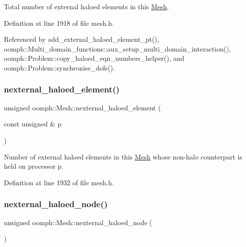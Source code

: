 Total number of external haloed elements in this \hyperlink{classoomph_1_1Mesh}{Mesh}. 



Definition at line 1918 of file mesh.\+h.



Referenced by add\+\_\+external\+\_\+haloed\+\_\+element\+\_\+pt(), oomph\+::\+Multi\+\_\+domain\+\_\+functions\+::aux\+\_\+setup\+\_\+multi\+\_\+domain\+\_\+interaction(), oomph\+::\+Problem\+::copy\+\_\+haloed\+\_\+eqn\+\_\+numbers\+\_\+helper(), and oomph\+::\+Problem\+::synchronise\+\_\+dofs().

\mbox{\label{classoomph_1_1Mesh_a32846269a1902f442314d6a711c64464}} 
\subsubsection{\texorpdfstring{nexternal\+\_\+haloed\+\_\+element()}{nexternal\_haloed\_element()}\hspace{0.1cm}{\footnotesize\ttfamily [2/2]}}
{\footnotesize\ttfamily unsigned oomph\+::\+Mesh\+::nexternal\+\_\+haloed\+\_\+element (\begin{DoxyParamCaption}\item[{const unsigned \&}]{p }\end{DoxyParamCaption})\hspace{0.3cm}{\ttfamily [inline]}}



Number of external haloed elements in this \hyperlink{classoomph_1_1Mesh}{Mesh} whose non-\/halo counterpart is held on processor p. 



Definition at line 1932 of file mesh.\+h.

\mbox{\label{classoomph_1_1Mesh_ad37eca6c72c9687954aa2d321938d692}} 
\subsubsection{\texorpdfstring{nexternal\+\_\+haloed\+\_\+node()}{nexternal\_haloed\_node()}\hspace{0.1cm}{\footnotesize\ttfamily [1/2]}}
{\footnotesize\ttfamily unsigned oomph\+::\+Mesh\+::nexternal\+\_\+haloed\+\_\+node (\begin{DoxyParamCaption}{ }\end{DoxyParamCaption})\hspace{0.3cm}{\ttfamily [inline]}}




